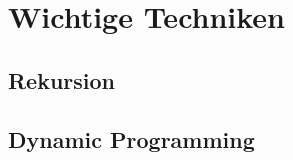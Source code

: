 \documentclass[../main.tex]{subfiles}
\begin{document}
	
	\section{Wichtige Techniken}
	
	\subsection{Rekursion}
	\clearpage
	
	\subsection{Dynamic Programming}
	\clearpage
	
\end{document}
